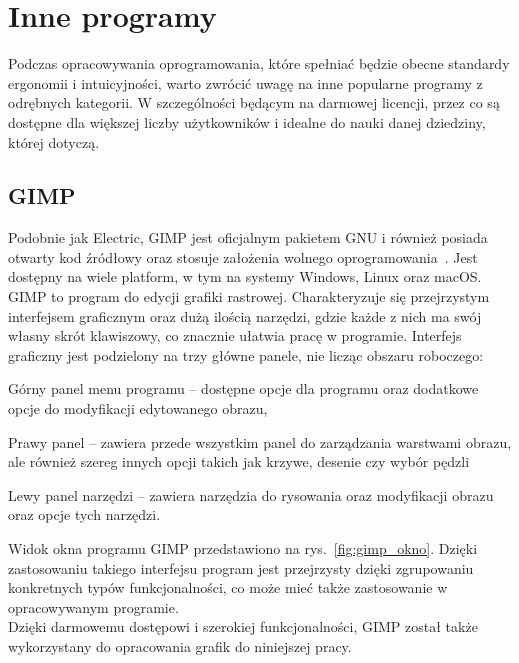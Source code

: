 \section{Inne programy}
\label{sec:inne_programy}

Podczas opracowywania oprogramowania,
które spełniać będzie obecne standardy ergonomii i intuicyjności,
warto zwrócić uwagę na inne popularne programy z odrębnych kategorii.
W szczególności będącym na darmowej licencji,
przez co są dostępne dla większej liczby użytkowników
i idealne do nauki danej dziedziny, której dotyczą.

\subsection{GIMP}
\label{subsec:gimp}

Podobnie jak Electric, GIMP jest oficjalnym pakietem GNU i również posiada otwarty kod źródłowy
oraz stosuje założenia wolnego oprogramowania~\cite{gimp_site}.
Jest dostępny na wiele platform, w tym na systemy Windows, Linux oraz macOS.
GIMP to program do edycji grafiki rastrowej.
Charakteryzuje się przejrzystym interfejsem graficznym oraz dużą ilością narzędzi,
gdzie każde z nich ma swój własny skrót klawiszowy, co znacznie ułatwia pracę w programie.
\indent Interfejs graficzny jest podzielony na trzy główne panele, nie licząc obszaru roboczego:

\begin{citemize}
    \item Górny panel menu programu -- dostępne opcje dla programu oraz dodatkowe opcje do modyfikacji edytowanego obrazu,
    \item Prawy panel -- zawiera przede wszystkim panel do zarządzania warstwami obrazu,
    ale również szereg innych opcji takich jak krzywe, desenie czy wybór pędzli
    \item Lewy panel narzędzi -- zawiera narzędzia do rysowania oraz modyfikacji obrazu oraz opcje tych narzędzi.
\end{citemize}

Widok okna programu GIMP przedstawiono na rys.~\ref{fig:gimp_okno}.
Dzięki zastosowaniu takiego interfejsu program jest przejrzysty dzięki zgrupowaniu konkretnych typów funkcjonalności,
co może mieć także zastosowanie w opracowywanym programie. \\
\indent Dzięki darmowemu dostępowi i szerokiej funkcjonalności,
GIMP został także wykorzystany do opracowania grafik do niniejszej pracy.

